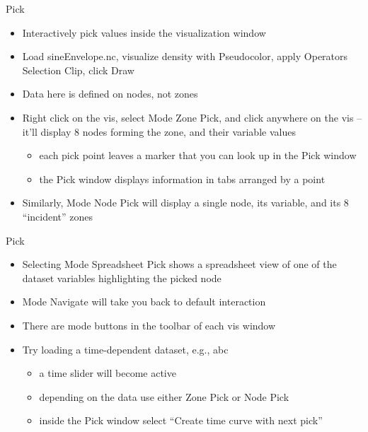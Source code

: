 \begin{frame}{Pick}
  \begin{itemize}\setlength{\itemsep}{3mm}
  \item Interactively pick values inside the visualization window
  \item Load sineEnvelope.nc, visualize density with Pseudocolor, apply Operators \ra Selection \ra Clip,
    click Draw
  \item Data here is defined on nodes, not zones
    \pause
  \item Right click on the vis, select Mode \ra Zone Pick, and click anywhere on the vis -- it'll display
    8 nodes forming the zone, and their variable values
    \begin{itemize}\setlength{\itemsep}{0mm}
    \item each pick point leaves a marker that you can look up in the Pick window
    \item the Pick window displays information in tabs arranged by a point
    \end{itemize}
    \pause
  \item Similarly, Mode \ra Node Pick will display a single node, its variable, and its 8 ``incident''
    zones
  \end{itemize}
\end{frame}

\begin{frame}{Pick}
  \begin{itemize}\setlength{\itemsep}{2mm}
  \item Selecting Mode \ra Spreadsheet Pick shows a spreadsheet view of one of the dataset variables
    highlighting the picked node
    \pause
  \item Mode \ra Navigate will take you back to default interaction
  \item There are mode buttons in the toolbar of each vis window
    \pause
  \item Try loading a time-dependent dataset, e.g., abc
    \begin{itemize}\setlength{\itemsep}{0mm}
    \item a time slider will become active
    \item depending on the data use either Zone Pick or Node Pick
    \item inside the Pick window select ``Create time curve with next pick''
    \end{itemize}
  \end{itemize}
\end{frame}

